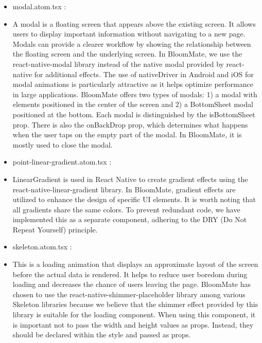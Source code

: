 \documentclass[conference, a4paper]{IEEEtran}
\begin{document}
\begin{enumerate}
\begin{enumerate}
\begin{itemize}
        \item modal.atom.tsx :
        \item[] A modal is a floating screen that appears above the existing screen. It allows users to display important information without navigating to a new page. Modals can provide a clearer workflow by showing the relationship between the floating screen and the underlying screen. In BloomMate, we use the react-native-modal library instead of the native modal provided by react-native for additional effects. The use of nativeDriver in Android and iOS for modal animations is particularly attractive as it helps optimize performance in large applications. BloomMate offers two types of modals: 1) a modal with elements positioned in the center of the screen and 2) a BottomSheet modal positioned at the bottom. Each modal is distinguished by the isBottomSheet prop. There is also the onBackDrop prop, which determines what happens when the user taps on the empty part of the modal. In BloomMate, it is mostly used to close the modal. \\

        \item point-linear-gradient.atom.tsx : 
        \item[] LinearGradient is used in React Native to create gradient effects using the react-native-linear-gradient library. In BloomMate, gradient effects are utilized to enhance the design of specific UI elements. It is worth noting that all gradients share the same colors. To prevent redundant code, we have implemented this as a separate component, adhering to the DRY (Do Not Repeat Yourself) principle. \\

        \item skeleton.atom.tsx : 
        \item[] This is a loading animation that displays an approximate layout of the screen before the actual data is rendered. It helps to reduce user boredom during loading and decreases the chance of users leaving the page. BloomMate has chosen to use the react-native-shimmer-placeholder library among various Skeleton libraries because we believe that the shimmer effect provided by this library is suitable for the loading component. When using this component, it is important not to pass the width and height values as props. Instead, they should be declared within the style and passed as props.\\


\end{itemize}
\end{enumerate}
\end{enumerate}
\end{document}
